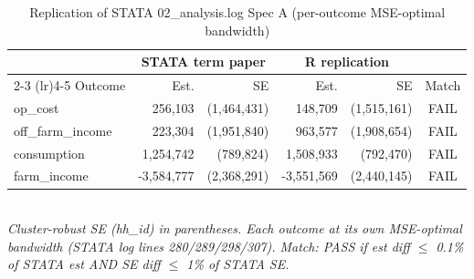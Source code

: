 \begin{table}[t]
\centering
\caption{Replication of STATA 02\_analysis.log Spec A (per-outcome MSE-optimal bandwidth)}
\label{tab:replication_specA}
\begin{tabular}{lrrrrc}
\toprule
 & \multicolumn{2}{c}{STATA term paper} & \multicolumn{2}{c}{R replication} & \\
\cmidrule(lr){2-3} \cmidrule(lr){4-5}
Outcome & Est. & SE & Est. & SE & Match \\
\midrule
op_cost & 256,103 & (1,464,431) & 148,709 & (1,515,161) & FAIL \\
off_farm_income & 223,304 & (1,951,840) & 963,577 & (1,908,654) & FAIL \\
consumption & 1,254,742 & (789,824) & 1,508,933 & (792,470) & FAIL \\
farm_income & -3,584,777 & (2,368,291) & -3,551,569 & (2,440,145) & FAIL \\
\bottomrule
\end{tabular}
\\
\footnotesize\textit{Cluster-robust SE (hh\_id) in parentheses. Each outcome at its own MSE-optimal bandwidth (STATA log lines 280/289/298/307). Match: PASS if est diff $\le$ 0.1\% of STATA est AND SE diff $\le$ 1\% of STATA SE.}
\end{table}

